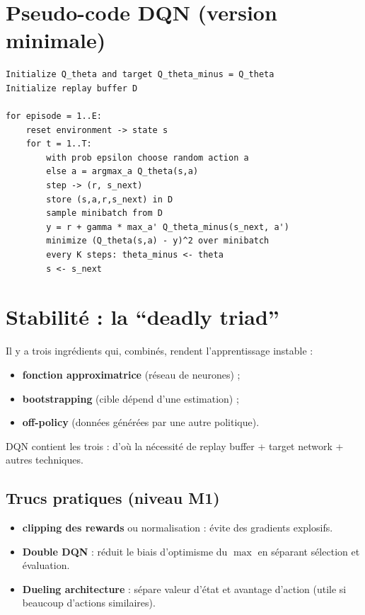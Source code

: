 \documentclass[11pt,a4paper]{report}
\newcommand{\1}{\mathbbm{1}}
\theoremstyle{definition}
\theoremstyle{plain}
\theoremstyle{remark}
\begin{document}
\section{Pseudo-code DQN (version minimale)}
\begin{lstlisting}[caption={DQN (version minimale, pseudo-code).},label={lst:dqn}]
Initialize Q_theta and target Q_theta_minus = Q_theta
Initialize replay buffer D

for episode = 1..E:
    reset environment -> state s
    for t = 1..T:
        with prob epsilon choose random action a
        else a = argmax_a Q_theta(s,a)
        step -> (r, s_next)
        store (s,a,r,s_next) in D
        sample minibatch from D
        y = r + gamma * max_a' Q_theta_minus(s_next, a')
        minimize (Q_theta(s,a) - y)^2 over minibatch
        every K steps: theta_minus <- theta
        s <- s_next
\end{lstlisting}

\section{Stabilité : la ``deadly triad''}
Il y a trois ingrédients qui, combinés, rendent l'apprentissage instable :
\begin{itemize}
  \item \textbf{fonction approximatrice} (réseau de neurones) ;
  \item \textbf{bootstrapping} (cible dépend d'une estimation) ;
  \item \textbf{off-policy} (données générées par une autre politique).
\end{itemize}
DQN contient les trois : d'où la nécessité de replay buffer + target network + autres techniques.

\subsection{Trucs pratiques (niveau M1)}
\begin{itemize}
  \item \textbf{clipping des rewards} ou normalisation : évite des gradients explosifs.
  \item \textbf{Double DQN} : réduit le biais d'optimisme du $\max$ en séparant sélection et évaluation.
  \item \textbf{Dueling architecture} : sépare valeur d'état et avantage d'action (utile si beaucoup d'actions similaires).
\end{itemize}
\end{document}
